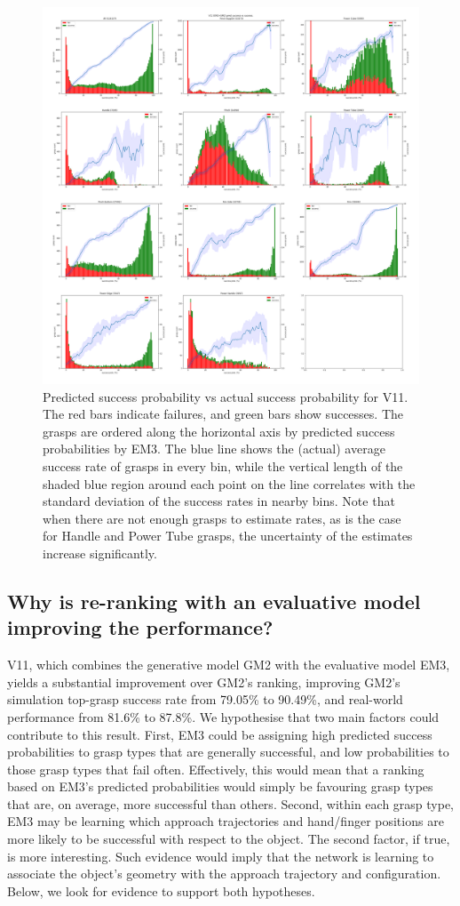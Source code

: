 \begin{figure}
\centering
\includegraphics[width=0.8\columnwidth]{images/post-analysis/V11_pred_success_vs_success.png}
\caption{Predicted success probability vs actual success probability for V11. The red bars indicate failures, and green bars show successes. The grasps are ordered along the horizontal axis by predicted success probabilities by EM3. The blue line shows the (actual) average success rate of grasps in every bin, while the vertical length of the shaded blue region around each point on the line correlates with the standard deviation of the success rates in nearby bins. Note that when there are not enough grasps to estimate rates, as is the case for Handle and Power Tube grasps, the uncertainty of the estimates increase significantly.}
\label{fig:calibrate}
\end{figure}


\subsection{Why is re-ranking with an evaluative model improving the performance?}
\noindent

V11, which combines the generative model GM2 with the evaluative model EM3, yields a substantial improvement over GM2's ranking, improving GM2's simulation top-grasp success rate from 79.05\% to 90.49\%, and real-world performance from 81.6\% to 87.8\%. We hypothesise that two main factors could contribute to this result. First, EM3 could be assigning high predicted success probabilities to grasp types that are generally successful, and low probabilities to those grasp types that fail often. Effectively, this would mean that a ranking based on EM3's predicted probabilities would simply be favouring grasp types that are, on average, more successful than others. Second, within each grasp type, EM3 may be learning which approach trajectories and hand/finger positions are more likely to be successful with respect to the object. The second factor, if true, is more interesting. Such evidence would imply that the network is learning to associate the object's geometry with the approach trajectory and configuration. Below, we look for evidence to support both hypotheses.

